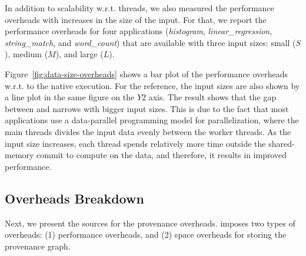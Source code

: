 
%



 In addition to scalability w.r.t.  threads, we also measured the performance overheads with increases in the size of the input.  For that, we
report the performance overheads for four applications ({\em histogram}, {\em linear\_regression}, {\em string\_match}, and {\em word\_count}) that are available with
three input sizes: small ($S$), medium ($M$), and large ($L$).


Figure~\ref{fig:data-size-overheads} shows a bar plot of the performance overheads w.r.t. to the native \pthreads execution. For the reference, the input sizes are also shown by a line plot in the same figure on the $Y2$ axis. The result shows that the gap between \pthreads and \projecttitle narrows with bigger input sizes. This is due to the fact that most applications use a data-parallel programming model for parallelization, where the main threads divides the input data evenly between the worker threads. As the input size increases, each thread spends relatively more time outside the shared-memory commit to compute on the data, and therefore, it results in improved performance.
 

%





\subsection{Overheads Breakdown}
\label{subsec:overheads-breakdown}
Next, we present  the sources for the provenance overheads. \projecttitle imposes two types of overheads: (1) performance overheads, and (2) space overheads for storing the provenance graph.


